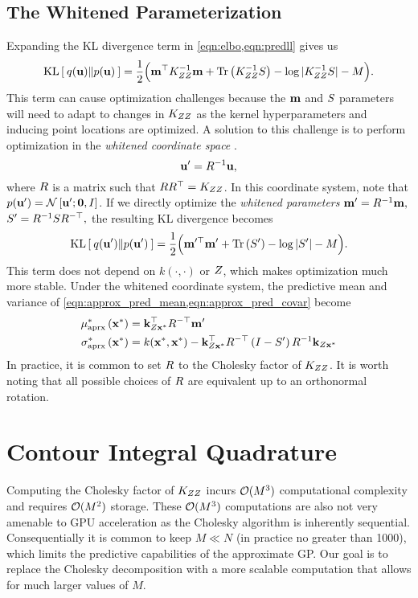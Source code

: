 \subsection{The Whitened Parameterization}

Expanding the KL divergence term in \cref{eqn:elbo,eqn:predll} gives us
%
\begin{equation}
	\kl{ q(\bu) }{ p(\bu) } = \frac{1}{2} \Bigl( \bm^\top \bK_{\bZ\bZ}^{-1} \bm + \tr{ \bK_{\bZ\bZ}^{-1} \bS } - \log \vert \bK_{\bZ\bZ}^{-1} \bS \vert - M \Bigr).
	\label{eqn:kldiv}
\end{equation}
%
This term can cause optimization challenges because the $\mathbf{m}$ and $S$ parameters will need to adapt to changes in $K_{ZZ}$ as the kernel hyperparameters and inducing point locations are optimized.
A solution to this challenge is to perform optimization in the \emph{whitened coordinate space} \cite{matthews2017scalable}.
\[ \mathbf{u}' = R^{-1} \mathbf{u}, \]
where $R$ is a matrix such that $R R^\top = K_{ZZ}$.
In this coordinate system, note that $p(\mathbf{u}') = \mathcal{N} \left[  \mathbf{u}'; \mathbf{0}, I \right]$.
If we directly optimize the \emph{whitened parameters} $\mathbf{m}' = R^{-1} \mathbf{m},$ $S' = R^{-1} S R^{-\top},$
the resulting KL divergence becomes
%
\begin{equation}
	\kl{ q(\bu') }{ p(\bu') } = \frac{1}{2} \Bigl( \bm^{\prime \top} \bm' + \tr{ \bS' } - \log \vert \bS' \vert - M \Bigr).
	\label{eqn:kldiv_whitened}
\end{equation}
%
This term does not depend on $k(\cdot,\cdot)$ or $Z$, which makes optimization much more stable.
Under the whitened coordinate system, the predictive mean and variance of \cref{eqn:approx_pred_mean,eqn:approx_pred_covar} become
%
\begin{align}
  \mu^*_\text{aprx} \left( \mathbf{x}^* \right) &= \mathbf{k}_{Z\mathbf{x}^*}^\top R^{-\top} \mathbf{m}'
  \label{eqn:approx_pred_mean} \\
  \sigma^*_\text{aprx} \left( \mathbf{x}^* \right) &= k(\mathbf{x}^*, \mathbf{x}^*) -
    \mathbf{k}_{Z\mathbf{x}^*}^\top R^{-\top} \left( I - S' \right) R^{-1} \mathbf{k}_{Z\mathbf{x}^*}
  \label{eqn:approx_pred_covar}
\end{align}
%
In practice, it is common to set $R$ to the Cholesky factor of $K_{ZZ}$.
It is worth noting that all possible choices of $R$ are equivalent up to an orthonormal rotation.


\section{Contour Integral Quadrature}
Computing the Cholesky factor of $K_{ZZ}$ incurs $\bigo{M^3}$ computational complexity and requires $\bigo{M^2}$ storage.
These $\bigo{M^3}$ computations are also not very amenable to GPU acceleration as the Cholesky algorithm is inherently sequential.
Consequentially it is common to keep $M \ll N$ (in practice no greater than 1000), which limits the predictive capabilities of the approximate GP.
Our goal is to replace the Cholesky decomposition with a more scalable computation that allows for much larger values of $M$.

